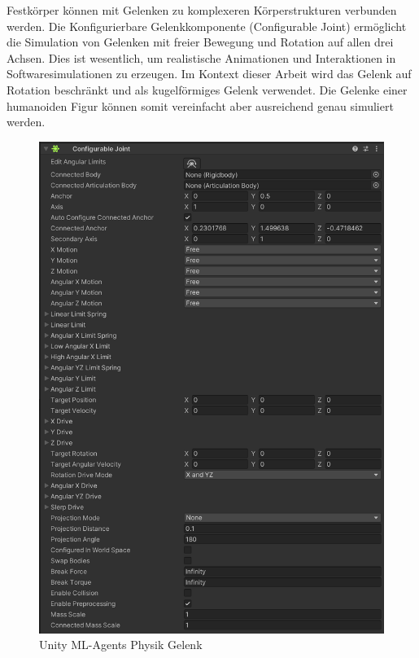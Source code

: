 Festkörper können mit Gelenken zu komplexeren Körperstrukturen verbunden werden. Die Konfigurierbare Gelenkkomponente (Configurable Joint) ermöglicht die Simulation von Gelenken mit freier Bewegung und Rotation auf allen drei Achsen. Dies ist wesentlich, um realistische Animationen und Interaktionen in Softwaresimulationen zu erzeugen. Im Kontext dieser Arbeit wird das Gelenk auf Rotation beschränkt und als kugelförmiges Gelenk verwendet. Die Gelenke einer humanoiden Figur können somit vereinfacht aber ausreichend genau simuliert werden.

\begin{figure}[H]
  \centering
  \includegraphics[scale=0.5]{img/physik_gelenk.png}
  \caption{Unity ML-Agents Physik Gelenk}
  \label{fig:physik_gelenk}
\end{figure}
